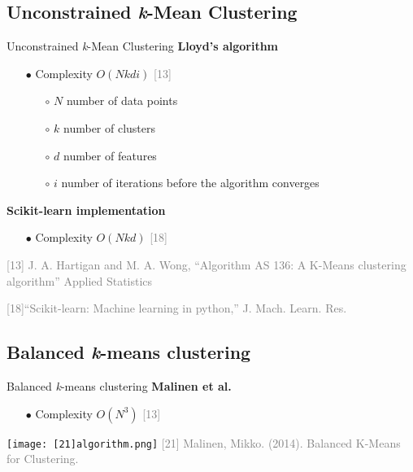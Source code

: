 \subsection{Unconstrained \textit{k}-Mean Clustering}
	\begin{frame}{Unconstrained \textit{k}-Mean Clustering}
		\textbf{Lloyd’s algorithm}
		\begin{itemize}
			\item[$\bullet$] Complexity $O(Nkdi)$ \textcolor{gray}{[13]}
			\begin{itemize}
				\item[$\circ$] $N$ number of data points
				\item[$\circ$] $k$ number of clusters 
				\item[$\circ$] $d$ number of features
				\item[$\circ$] $i$ number of iterations before the algorithm converges
			\end{itemize} 
		\end{itemize}
		\textbf{Scikit-learn implementation}
		\begin{itemize}
			\item[$\bullet$] Complexity $O(Nkd)$ \textcolor{gray}{[18]}
		\end{itemize}
		\bigbreak
		\tiny{ %
			\textcolor{gray}{
				\begin{minipage}{0.5\textwidth} %
					[13] J. A. Hartigan and M. A. Wong, “Algorithm AS 136: A K-Means clustering algorithm” Applied Statistics
				\end{minipage}\hfill
				\begin{minipage}{0.5\textwidth} 
					[18]“Scikit-learn: Machine learning in python,” J. Mach. Learn. Res.
				\end{minipage}\hfill
			}
		}
	\end{frame}
	



\subsection{Balanced \textit{k}-means clustering}
	\begin{frame}{Balanced \textit{k}-means clustering}
		\textbf{Malinen et al.}
		\begin{itemize}
			\item[$\bullet$] Complexity $O(N^3)$ \textcolor{gray}{[13]}
		\end{itemize}
		\texttt{[image: [21]algorithm.png]}
		\break
		\tiny{ %
			\textcolor{gray}{
				[21] Malinen, Mikko. (2014). Balanced K-Means for Clustering. 
			}
		}
	\end{frame}

